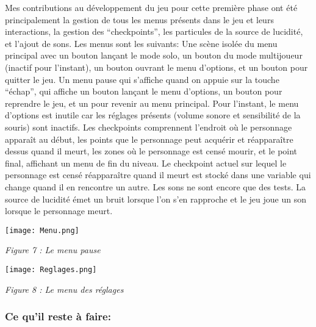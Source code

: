 \documentclass[a4paper]{article}
\begin{document}
    Mes contributions au développement du jeu pour cette première phase ont été principalement la gestion de tous les menus présents dans le jeu et leurs interactions, la gestion des “checkpoints”, les particules de la source de lucidité, et l’ajout de sons.
Les menus sont les suivants: 
Une scène isolée du menu principal avec un bouton lançant le mode solo, un bouton du mode multijoueur (inactif pour l’instant), un bouton ouvrant le menu d’options, et un bouton pour quitter le jeu.
Un menu pause qui s’affiche quand on appuie sur la touche “échap”, qui affiche un bouton lançant le menu d’options, un bouton pour reprendre le jeu, et un pour revenir au menu principal.
Pour l’instant, le menu d’options est inutile car les réglages présents (volume sonore et sensibilité de la souris) sont inactifs.
Les checkpoints comprennent l’endroit où le personnage apparaît au début, les points que le personnage peut acquérir et réapparaître dessus quand il meurt, les zones où le personnage est censé mourir, et le point final, affichant un menu de fin du niveau. Le checkpoint actuel sur lequel le personnage est censé réapparaître quand il meurt est stocké dans une variable qui change quand il en rencontre un autre.
Les sons ne sont encore que des tests. La source de lucidité émet un bruit lorsque l’on s’en rapproche et le jeu joue un son lorsque le personnage meurt.

\quad

\begin{center}

\texttt{[image: Menu.png]}

\quad

\textit {Figure 7 : Le menu pause }

\end{center}



\quad

\begin{center}

\texttt{[image: Reglages.png]}

\quad

\textit {Figure 8 : Le menu des réglages}

\end{center}


\quad

		\subsubsection{Ce qu'il reste à faire:}
\end{document}
